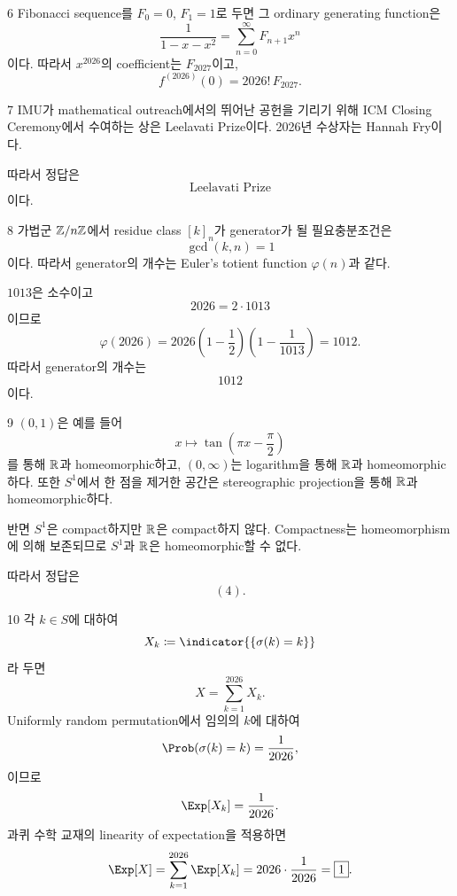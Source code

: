 \documentclass[11pt,oneside]{article}
\begin{document}
\begin{problemsolution}{6}
Fibonacci sequence를 $F_0=0$, $F_1=1$로 두면 그 ordinary generating function은
\[
    \frac{1}{1-x-x^2}
    =
    \sum_{n=0}^{\infty}F_{n+1}x^n
\]
이다. 따라서 $x^{2026}$의 coefficient는 $F_{2027}$이고,
\[
    \boxed{f^{(2026)}(0)=2026!\,F_{2027}}.
\]
\end{problemsolution}

\begin{problemsolution}{7}
IMU가 mathematical outreach에서의 뛰어난 공헌을 기리기 위해 ICM Closing Ceremony에서 수여하는 상은 Leelavati Prize이다. 2026년 수상자는 Hannah Fry이다.

따라서 정답은
\[
    \boxed{\text{Leelavati Prize}}
\]
이다.
\end{problemsolution}

\begin{problemsolution}{8}
가법군 $\mathbb{Z}/n\mathbb{Z}$에서 residue class $[k]_n$가 generator가 될 필요충분조건은
\[
    \gcd(k,n)=1
\]
이다. 따라서 generator의 개수는 Euler's totient function $\varphi(n)$과 같다.

$1013$은 소수이고
\[
    2026=2\cdot1013
\]
이므로
\[
    \varphi(2026)
    =
    2026\left(1-\frac12\right)
    \left(1-\frac{1}{1013}\right)
    =1012.
\]
따라서 generator의 개수는
\[
    \boxed{1012}
\]
이다.
\end{problemsolution}

\begin{problemsolution}{9}
$(0,1)$은 예를 들어
\[
    x\mapsto\tan\left(\pi x-\frac{\pi}{2}\right)
\]
를 통해 $\mathbb{R}$과 homeomorphic하고, $(0,\infty)$는 logarithm을 통해 $\mathbb{R}$과 homeomorphic하다. 또한 $S^1$에서 한 점을 제거한 공간은 stereographic projection을 통해 $\mathbb{R}$과 homeomorphic하다.

반면 $S^1$은 compact하지만 $\mathbb{R}$은 compact하지 않다. Compactness는 homeomorphism에 의해 보존되므로 $S^1$과 $\mathbb{R}$은 homeomorphic할 수 없다.

따라서 정답은
\[
    \boxed{(4)}.
\]
\end{problemsolution}

\begin{problemsolution}{10}
각 $k\in S$에 대하여
\[
    X_k
    \coloneqq
    \indicator{\{\sigma(k)=k\}}
\]
라 두면
\[
    X=\sum_{k=1}^{2026}X_k.
\]
Uniformly random permutation에서 임의의 $k$에 대하여
\[
    \Prob(\sigma(k)=k)=\frac{1}{2026},
\]
이므로
\[
    \Exp[X_k]=\frac{1}{2026}.
\]
과퀴 수학 교재의 linearity of expectation을 적용하면
\[
    \Exp[X]
    =
    \sum_{k=1}^{2026}\Exp[X_k]
    =
    2026\cdot\frac{1}{2026}
    =
    \boxed{1}.
\]
\end{problemsolution}
\end{document}
